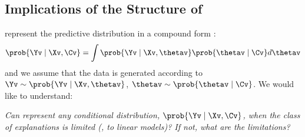 \documentclass[twoside,11pt]{article}
\begin{document}
\subsection{Implications of the Structure of {\CENs}}
\label{sec:CEN-structure-implications}

{\CENs} represent the predictive distribution in a compound form \citep{lindsay1995mixture}:
\begin{equation*}
    \prob{\Yv \mid \Xv, \Cv} = \int \prob{\Yv \mid \Xv, \thetav} \prob{\thetav \mid \Cv} d\thetav
\end{equation*}
and we assume that the data is generated according to $\Yv \sim \prob{\Yv \mid \Xv, \thetav}$, $\thetav \sim \prob{\thetav \mid \Cv}$.
We would like to understand:

\vspace{1.5ex}
\begin{blockquote}
    \emph{Can {\CEN} represent any conditional distribution, $\prob{\Yv \mid \Xv, \Cv}$, when the class of explanations is limited (\eg, to linear models)? If not, what are the limitations?}
\end{blockquote}
\vspace{1.5ex}
\end{document}
